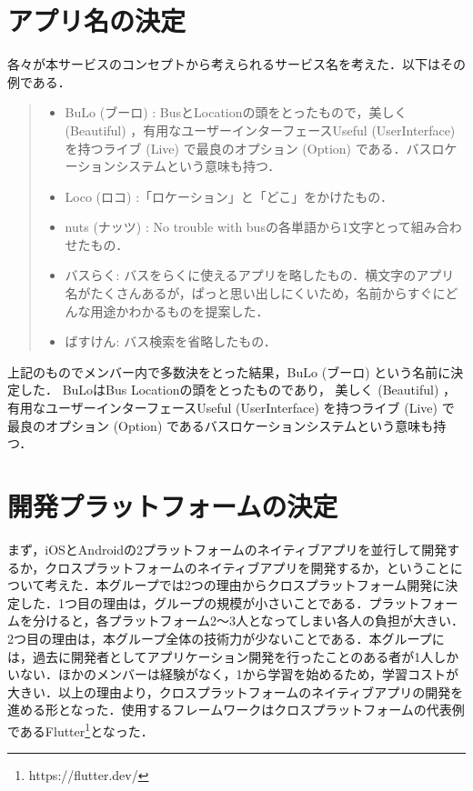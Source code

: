 \section{アプリ名の決定}
各々が本サービスのコンセプトから考えられるサービス名を考えた．以下はその例である．
\begin{quote}
    \begin{itemize}
        \item BuLo (ブーロ) : BusとLocationの頭をとったもので，美しく (Beautiful) ，有用なユーザーインターフェースUseful (UserInterface) を持つライブ (Live) で最良のオプション (Option) である．バスロケーションシステムという意味も持つ．
        \item Loco (ロコ) :「ロケーション」と「どこ」をかけたもの．
        \item nuts (ナッツ) : No trouble with busの各単語から1文字とって組み合わせたもの．
        \item バスらく: バスをらくに使えるアプリを略したもの．横文字のアプリ名がたくさんあるが，ぱっと思い出しにくいため，名前からすぐにどんな用途かわかるものを提案した．
        \item ばすけん: バス検索を省略したもの．
    \end{itemize}
\end{quote}
上記のものでメンバー内で多数決をとった結果，BuLo (ブーロ) という名前に決定した．
BuLoはBus Locationの頭をとったものであり，
美しく (Beautiful) ，有用なユーザーインターフェースUseful (UserInterface) を持つライブ (Live) で最良のオプション (Option) であるバスロケーションシステムという意味も持つ．

\section{開発プラットフォームの決定}
まず，iOSとAndroidの2プラットフォームのネイティブアプリを並行して開発するか，クロスプラットフォームのネイティブアプリを開発するか，ということについて考えた．本グループでは2つの理由からクロスプラットフォーム開発に決定した．1つ目の理由は，グループの規模が小さいことである．プラットフォームを分けると，各プラットフォーム2〜3人となってしまい各人の負担が大きい．2つ目の理由は，本グループ全体の技術力が少ないことである．本グループには，過去に開発者としてアプリケーション開発を行ったことのある者が1人しかいない．ほかのメンバーは経験がなく，1から学習を始めるため，学習コストが大きい．以上の理由より，クロスプラットフォームのネイティブアプリの開発を進める形となった．使用するフレームワークはクロスプラットフォームの代表例であるFlutter\footnote{https://flutter.dev/}となった．

